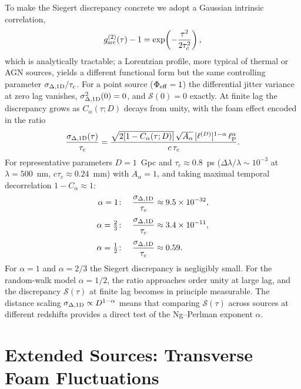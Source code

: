 \documentclass[aps,prd,onecolumn,amsmath,amssymb]{revtex4-2}
\begin{document}
To make the Siegert discrepancy concrete we adopt a Gaussian intrinsic
correlation,
\begin{equation}
  g^{(2)}_{\rm src}(\tau) - 1
  = \exp\!\left(-\frac{\tau^2}{2\tau_c^2}\right),
  \label{eq:g2src_gauss}
\end{equation}
which is analytically tractable; a Lorentzian profile, more typical of thermal
or AGN sources, yields a different functional form but the same controlling
parameter $\sigma_{\Delta,{\rm 1D}}/\tau_c$.
For a point source ($\Phi_{\rm eff} = 1$) the differential jitter variance at
zero lag vanishes, $\sigma_{\Delta,{\rm 1D}}^2(0) = 0$, and
$\mathcal{S}(0) = 0$ exactly.
At finite lag the discrepancy grows as $C_\alpha(\tau;D)$ decays from unity,
with the foam effect encoded in the ratio
\begin{equation}
  \frac{\sigma_{\Delta,{\rm 1D}}(\tau)}{\tau_c}
  = \frac{\sqrt{2[1-C_\alpha(\tau;D)]}\,\sqrt{A_\alpha}\,
          [\ell^{(D)}]^{1-\alpha}\,\ell_{\rm P}^{\alpha}}
         {c\,\tau_c}.
  \label{eq:ratio1D}
\end{equation}
For representative parameters $D = 1$~Gpc and $\tau_c \approx 0.8$~ps
($\Delta\lambda/\lambda \sim 10^{-3}$ at $\lambda = 500$~nm,
$c\tau_c \approx 0.24$~mm) with $A_\alpha = 1$, and taking maximal temporal
decorrelation $1 - C_\alpha \approx 1$:
\begin{align}
  \alpha = 1\colon\quad
    \frac{\sigma_{\Delta,{\rm 1D}}}{\tau_c}
    &\approx 9.5\times10^{-32},
    \label{eq:ratio1D_alpha1}\\[4pt]
  \alpha = \tfrac{2}{3}\colon\quad
    \frac{\sigma_{\Delta,{\rm 1D}}}{\tau_c}
    &\approx 3.4\times10^{-11},
    \label{eq:ratio1D_alpha23}\\[4pt]
  \alpha = \tfrac{1}{2}\colon\quad
    \frac{\sigma_{\Delta,{\rm 1D}}}{\tau_c}
    &\approx 0.59.
    \label{eq:ratio1D_alpha12}
\end{align}
For $\alpha = 1$ and $\alpha = 2/3$ the Siegert discrepancy is negligibly
small.
For the random-walk model $\alpha = 1/2$, the ratio approaches order unity
at large lag, and the discrepancy $\mathcal{S}(\tau)$ at finite lag becomes
in principle measurable.
The distance scaling $\sigma_{\Delta,{\rm 1D}} \propto D^{1-\alpha}$ means
that comparing $\mathcal{S}(\tau)$ across sources at different redshifts
provides a direct test of the Ng--Perlman exponent $\alpha$.

\section{Extended Sources: Transverse Foam Fluctuations}
\label{sec:derivation}
\end{document}
